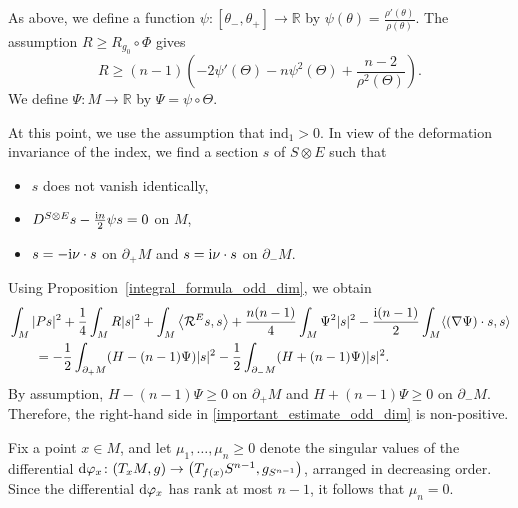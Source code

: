 \documentclass[11pt]{article}
\numberwithin{equation}{section}
\numberwithin{equation}{section}
\newcommand{\R}{\mathbb{R}}
\begin{document}
As above, we define a function $\psi\colon [\theta_-,\theta_+] \to \R$ by $\psi(\theta) = \frac{\rho'(\theta)}{\rho(\theta)}$. The assumption $R \geq R_{g_0} \circ \Phi$ gives
\begin{equation} \label{ineq_for_scal_odd_dim}
R \geq (n-1) \left( -2 \psi'(\Theta) - n \psi^2(\Theta) + \frac{n-2}{\rho^2(\Theta)} \right).
\end{equation}
We define $\Psi\colon M \to \R$ by $\Psi = \psi \circ \Theta$.

At this point, we use the assumption that $\mathrm{ind}_1 > 0$. In view of the deformation invariance of the index, we find a section $s$ of $S \otimes E$ such that
\begin{itemize}\itemsep=0pt
 \item $s$ does not vanish identically,
 \item $D^{S \otimes E } s - \frac{{\rm i}n}{2} \psi s = 0$ on $M$,
 \item $s = -{\rm i} \nu \cdot s$ on $\partial_+ M$ and $s = {\rm i} \nu \cdot s$ on $\partial_- M$.
\end{itemize}
Using Proposition~\ref{integral_formula_odd_dim}, we obtain
\begin{align}
&\int_M |P s|^2 + \frac{1}{4} \int_M R |s|^2
+ \int_M \big\langle \mathcal{R}^E s,s \big\rangle + \frac{n(n-1)}{4} \int_M \Psi^2 |s|^2 - \frac{{\rm i}(n-1)}{2} \int_M \langle (\nabla \Psi) \cdot s,s \rangle\nonumber \\
&\qquad= -\frac{1}{2} \int_{\partial_+ M} (H-(n-1)\Psi) |s|^2 - \frac{1}{2} \int_{\partial_- M} (H+(n-1)\Psi) |s|^2. \label{important_estimate_odd_dim}
\end{align}
By assumption, $H-(n-1)\Psi \geq 0$ on $\partial_+ M$ and $H +(n-1)\Psi \geq 0$ on $\partial_- M$. Therefore, the right-hand side in \eqref{important_estimate_odd_dim} is non-positive.

Fix a point $x \in M $, and let $ \mu_1,\hdots,\mu_n \geq 0$ denote the singular values of the differential ${\rm d}\varphi_x\colon (T_x M,g ) \to \big(T_{f(x)} S^{n-1} ,g_{S^{n-1}}\big)$, arranged in decreasing order. Since the differential ${\rm d}\varphi_x$ has rank at most $n-1$, it follows that $\mu_n = 0$.
\end{document}
